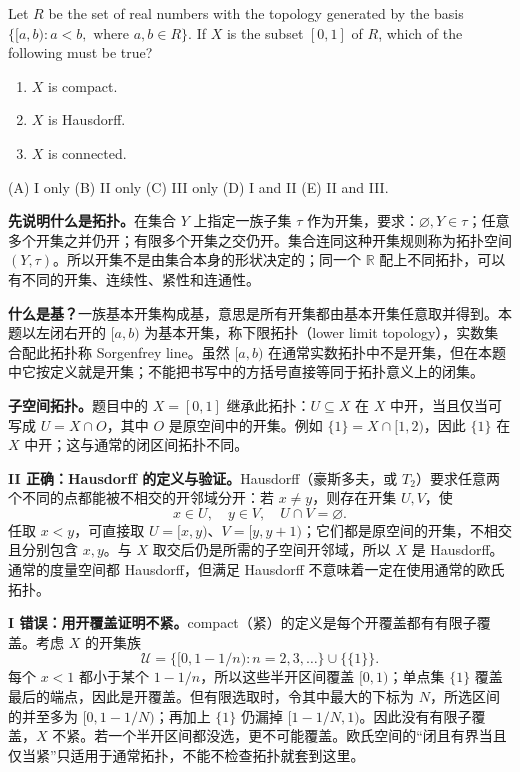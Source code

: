 \documentclass[11pt,a4paper,fontset=fandol]{ctexart}
\begin{document}
Let $R$ be the set of real numbers with the topology generated by the basis $\{[a,b):a<b,\text{ where }a,b\in R\}$. If $X$ is the subset $[0,1]$ of $R$, which of the following must be true?
\begin{enumerate}[label=\Roman*.]
\item $X$ is compact.
\item $X$ is Hausdorff.
\item $X$ is connected.
\end{enumerate}
(A) I only \quad (B) II only \quad (C) III only \quad (D) I and II \quad (E) II and III.

\textbf{先说明什么是拓扑。}在集合 $Y$ 上指定一族子集 $\tau$ 作为开集，要求：$\varnothing,Y\in\tau$；任意多个开集之并仍开；有限多个开集之交仍开。集合连同这种开集规则称为拓扑空间 $(Y,\tau)$。所以开集不是由集合本身的形状决定的；同一个 $\mathbb R$ 配上不同拓扑，可以有不同的开集、连续性、紧性和连通性。

\textbf{什么是基？}一族基本开集构成基，意思是所有开集都由基本开集任意取并得到。本题以左闭右开的 $[a,b)$ 为基本开集，称下限拓扑（lower limit topology），实数集合配此拓扑称 Sorgenfrey line。虽然 $[a,b)$ 在通常实数拓扑中不是开集，但在本题中它按定义就是开集；不能把书写中的方括号直接等同于拓扑意义上的闭集。

\textbf{子空间拓扑。}题目中的 $X=[0,1]$ 继承此拓扑：$U\subseteq X$ 在 $X$ 中开，当且仅当可写成 $U=X\cap O$，其中 $O$ 是原空间中的开集。例如 $\{1\}=X\cap[1,2)$，因此 $\{1\}$ 在 $X$ 中开；这与通常的闭区间拓扑不同。

\textbf{II 正确：Hausdorff 的定义与验证。}Hausdorff（豪斯多夫，或 $T_2$）要求任意两个不同的点都能被不相交的开邻域分开：若 $x\ne y$，则存在开集 $U,V$，使
\[
x\in U,\quad y\in V,\quad U\cap V=\varnothing.
\]
任取 $x<y$，可直接取 $U=[x,y)$、$V=[y,y+1)$；它们都是原空间的开集，不相交且分别包含 $x,y$。与 $X$ 取交后仍是所需的子空间开邻域，所以 $X$ 是 Hausdorff。通常的度量空间都 Hausdorff，但满足 Hausdorff 不意味着一定在使用通常的欧氏拓扑。

\textbf{I 错误：用开覆盖证明不紧。}compact（紧）的定义是每个开覆盖都有有限子覆盖。考虑 $X$ 的开集族
\[
\mathcal U=\{[0,1-1/n):n=2,3,\ldots\}\cup\{\{1\}\}.
\]
每个 $x<1$ 都小于某个 $1-1/n$，所以这些半开区间覆盖 $[0,1)$；单点集 $\{1\}$ 覆盖最后的端点，因此是开覆盖。但有限选取时，令其中最大的下标为 $N$，所选区间的并至多为 $[0,1-1/N)$；再加上 $\{1\}$ 仍漏掉 $[1-1/N,1)$。因此没有有限子覆盖，$X$ 不紧。若一个半开区间都没选，更不可能覆盖。欧氏空间的“闭且有界当且仅当紧”只适用于通常拓扑，不能不检查拓扑就套到这里。
\end{document}
